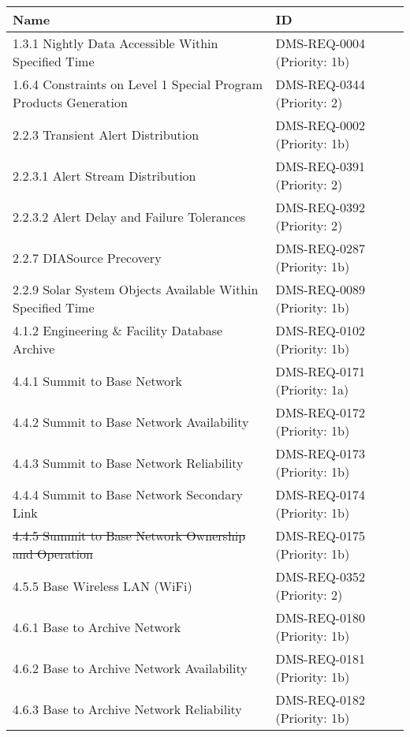 \documentclass[DM,lsstdraft,STS,toc]{lsstdoc}
\begin{document}
\begin{center}
\begin{tabular}{|l|l|}
\hline
    \bf Name & \bf ID \\ \hline
    1.3.1 Nightly Data Accessible Within Specified Time         & DMS-REQ-0004 (Priority: 1b) \\ \hline
    1.6.4 Constraints on Level 1 Special Program Products Generation & DMS-REQ-0344 (Priority: 2) \\ \hline
    2.2.3 Transient Alert Distribution                          & DMS-REQ-0002 (Priority: 1b) \\ \hline %
    2.2.3.1 Alert Stream Distribution                           & DMS-REQ-0391 (Priority: 2) \\ \hline
    2.2.3.2 Alert Delay and Failure Tolerances                  & DMS-REQ-0392 (Priority: 2) \\ \hline
    2.2.7 DIASource Precovery                                   & DMS-REQ-0287 (Priority: 1b) \\ \hline
    2.2.9 Solar System Objects Available Within Specified Time  & DMS-REQ-0089 (Priority: 1b) \\ \hline
    4.1.2 Engineering \& Facility Database Archive              & DMS-REQ-0102 (Priority: 1b) \\ \hline
    4.4.1 Summit to Base Network                                & DMS-REQ-0171 (Priority: 1a) \\ \hline
    4.4.2 Summit to Base Network Availability                   & DMS-REQ-0172 (Priority: 1b) \\ \hline
    4.4.3 Summit to Base Network Reliability                    & DMS-REQ-0173 (Priority: 1b) \\ \hline
    4.4.4 Summit to Base Network Secondary Link                 & DMS-REQ-0174 (Priority: 1b) \\ \hline
    \sout{4.4.5 Summit to Base Network Ownership and Operation} & DMS-REQ-0175 (Priority: 1b) \\ \hline %
    4.5.5 Base Wireless LAN (WiFi)                              & DMS-REQ-0352 (Priority: 2) \\ \hline
    4.6.1 Base to Archive Network                               & DMS-REQ-0180 (Priority: 1b) \\ \hline
    4.6.2 Base to Archive Network Availability                  & DMS-REQ-0181 (Priority: 1b) \\ \hline
    4.6.3 Base to Archive Network Reliability                   & DMS-REQ-0182 (Priority: 1b) \\ \hline

\end{tabular}
\end{center}
\end{document}
